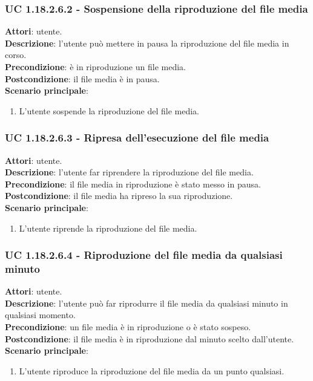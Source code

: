 	\subsubsection{UC 1.18.2.6.2 - Sospensione della riproduzione del file media}{
		\label{uc1.18.2.6.2}
		\textbf{Attori}: utente. \\
		\textbf{Descrizione}: l'utente può mettere in pausa la riproduzione del file media in corso. \\
		\textbf{Precondizione}: è in riproduzione un file media.	\\
		\textbf{Postcondizione}: il file media è in pausa.\\
		\textbf{Scenario principale}:
		\begin{enumerate}
			\item L'utente sospende la riproduzione del file media.
		\end{enumerate}				
	}
	\subsubsection{UC 1.18.2.6.3 - Ripresa dell'esecuzione del file media}{
		\label{uc1.18.2.6.3}
		\textbf{Attori}: utente. \\
		\textbf{Descrizione}: l'utente far riprendere la riproduzione del file media. \\
		\textbf{Precondizione}: il file media in riproduzione è stato messo in pausa.	\\
		\textbf{Postcondizione}: il file media ha ripreso la sua riproduzione.\\
		\textbf{Scenario principale}:
		\begin{enumerate}
			\item L'utente riprende la riproduzione del file media.
		\end{enumerate}				
	}
	\subsubsection{UC 1.18.2.6.4 - Riproduzione del file media da qualsiasi minuto}{
		\label{uc1.18.2.6.4}
		\textbf{Attori}: utente. \\
		\textbf{Descrizione}: l'utente può far riprodurre il file media da qualsiasi minuto in qualsiasi momento. \\
		\textbf{Precondizione}: un file media è in riproduzione o è stato sospeso.	\\
		\textbf{Postcondizione}: il file media è in riproduzione dal minuto scelto dall'utente.\\
		\textbf{Scenario principale}:
		\begin{enumerate}
			\item L'utente riproduce la riproduzione del file media da un punto qualsiasi.
		\end{enumerate}				
	}
